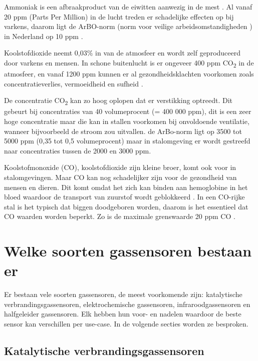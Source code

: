 Ammoniak is een afbraakproduct van de eiwitten aanwezig in de mest \autocite{Wolf2013}. Al vanaf 20 ppm (Parts Per Million) in de lucht treden er schadelijke effecten op bij varkens, daarom ligt de ArBO-norm (norm voor veilige arbeidsomstandigheden \autocite{arbo2021}) in Nederland op 10 ppm \autocite{PGS2014}.

Koolstofdioxide neemt 0,03\% in van de atmosfeer \autocite{KMI2024} en wordt zelf geproduceerd door varkens en mensen. In schone buitenlucht is er ongeveer 400 ppm CO\textsubscript{2} in de atmosfeer, en vanaf 1200 ppm kunnen er al gezondheidsklachten voorkomen zoals concentratieverlies, vermoeidheid en sufheid \autocite{Jacobson2019}.

De concentratie CO\textsubscript{2} kan zo hoog oplopen dat er verstikking optreedt. Dit gebeurt bij concentraties van 40 volumeprocent (= 400 000 ppm), dit is een zeer hoge concentratie maar die kan in stallen voorkomen bij onvoldoende ventilatie, wanneer bijvoorbeeld de stroom zou uitvallen. de ArBo-norm ligt op 3500 tot 5000 ppm (0,35 tot 0,5 volumeprocent) maar in stalomgeving er wordt gestreefd naar concentraties tussen de 2000 en 3000 ppm.

Koolstofmonoxide (CO), koolstofdioxide zijn kleine broer, komt ook voor in stalomgevingen. Maar CO kan nog schadelijker zijn voor de gezondheid van mensen en dieren. Dit komt omdat het zich kan binden aan hemoglobine in het bloed waardoor de transport van zuurstof wordt geblokkeerd \autocite{Wolf2013}. In een CO-rijke stal is het typisch dat biggen doodgeboren worden, daarom is het essentieel dat CO waarden worden beperkt. Zo is de maximale grenswaarde 20 ppm CO \autocite{Kiwa2024}.




\section{Welke soorten gassensoren bestaan er}%
\label{sec:soorten-gassensoren}

Er bestaan vele soorten gassensoren, de meest voorkomende zijn: katalytische verbrandingsgassensoren, elektrochemische gassensoren, infraroodgassensoren en halfgeleider gassensoren. Elk hebben hun voor- en nadelen waardoor de beste sensor kan verschillen per use-case. In de volgende secties worden ze besproken.

\subsection{Katalytische verbrandingsgassensoren}
\label{subsec:katalytische}

